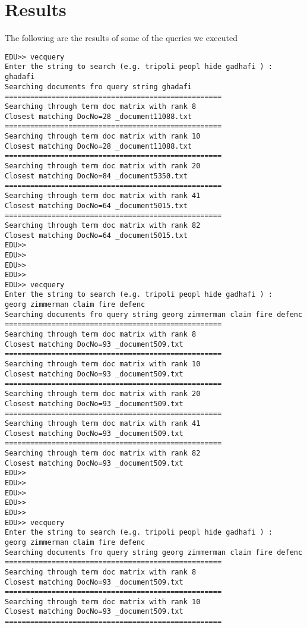 \documentclass[twoside,11pt]{article}\usepackage{amsmath,amsfonts,amsthm,fullpage}
\begin{document}
\section{Results}
The following are the results of some of the queries we executed
\begin{verbatim}
EDU>> vecquery
Enter the string to search (e.g. tripoli peopl hide gadhafi ) :
ghadafi
Searching documents fro query string ghadafi
===================================================
Searching through term doc matrix with rank 8
Closest matching DocNo=28 _document11088.txt 
===================================================
Searching through term doc matrix with rank 10
Closest matching DocNo=28 _document11088.txt 
===================================================
Searching through term doc matrix with rank 20
Closest matching DocNo=84 _document5350.txt 
===================================================
Searching through term doc matrix with rank 41
Closest matching DocNo=64 _document5015.txt 
===================================================
Searching through term doc matrix with rank 82
Closest matching DocNo=64 _document5015.txt 
EDU>> 
EDU>> 
EDU>> 
EDU>> 
EDU>> vecquery
Enter the string to search (e.g. tripoli peopl hide gadhafi ) :
georg zimmerman claim fire defenc
Searching documents fro query string georg zimmerman claim fire defenc
===================================================
Searching through term doc matrix with rank 8
Closest matching DocNo=93 _document509.txt 
===================================================
Searching through term doc matrix with rank 10
Closest matching DocNo=93 _document509.txt 
===================================================
Searching through term doc matrix with rank 20
Closest matching DocNo=93 _document509.txt 
===================================================
Searching through term doc matrix with rank 41
Closest matching DocNo=93 _document509.txt 
===================================================
Searching through term doc matrix with rank 82
Closest matching DocNo=93 _document509.txt 
EDU>> 
EDU>> 
EDU>> 
EDU>> 
EDU>> 
EDU>> vecquery
Enter the string to search (e.g. tripoli peopl hide gadhafi ) :
georg zimmerman claim fire defenc
Searching documents fro query string georg zimmerman claim fire defenc
===================================================
Searching through term doc matrix with rank 8
Closest matching DocNo=93 _document509.txt 
===================================================
Searching through term doc matrix with rank 10
Closest matching DocNo=93 _document509.txt 
===================================================

\end{verbatim}
\end{document}

